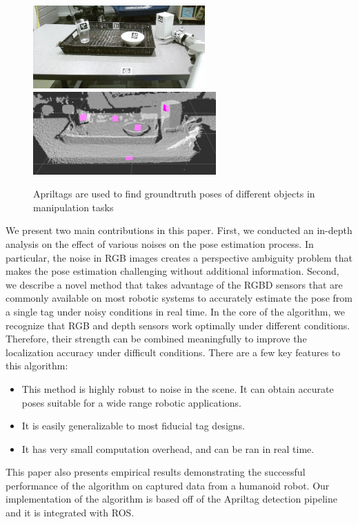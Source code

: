 \begin{figure}[h]
\includegraphics[width=\columnwidth, height=120px]{figs/table_clearing_rgb_small} \\
\includegraphics[width=\columnwidth, height=120px]{figs/table_clearing_depth}
\label{fig:table_clearing}
\caption{Apriltags are used to find groundtruth poses of different objects in manipulation tasks}
\end{figure}

We present two main contributions in this paper. First, we conducted an in-depth analysis on the effect of various noises on the pose estimation process. In particular, the noise in RGB images creates a perspective ambiguity problem that makes the pose estimation challenging without additional information. Second, we describe a novel method that takes advantage of the RGBD sensors that are commonly available on most robotic systems to accurately estimate the pose from a single tag under noisy conditions in real time. In the core of the algorithm, we recognize that RGB and depth sensors work optimally under different conditions. Therefore, their strength can be combined meaningfully to improve the localization accuracy under difficult conditions. There are a few key features to this algorithm: 
\begin{itemize}
\item This method is highly robust to noise in the scene. It can obtain accurate poses suitable for a wide range robotic applications.   
\item It is easily generalizable to most fiducial tag designs.
\item It has very small computation overhead, and can be ran in real time. 
\end{itemize}

This paper also presents empirical results demonstrating the successful performance of the algorithm on captured data from a humanoid robot. Our implementation of the algorithm is based off of the Apriltag detection pipeline and it is integrated with ROS. 